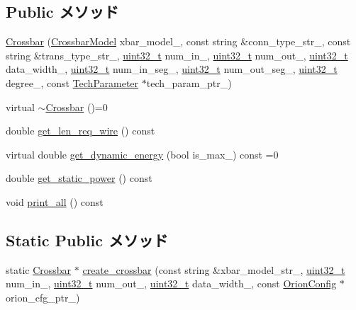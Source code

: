 \subsection*{Public メソッド}
\begin{DoxyCompactItemize}
\item 
\hyperlink{classCrossbar_a7173a2d0073951cf449b0487c70479d3}{Crossbar} (\hyperlink{classCrossbar_aa40a1579cdca31019cb80ae5fd05b613}{CrossbarModel} xbar\_\-model\_\-, const string \&conn\_\-type\_\-str\_\-, const string \&trans\_\-type\_\-str\_\-, \hyperlink{Type_8hh_a435d1572bf3f880d55459d9805097f62}{uint32\_\-t} num\_\-in\_\-, \hyperlink{Type_8hh_a435d1572bf3f880d55459d9805097f62}{uint32\_\-t} num\_\-out\_\-, \hyperlink{Type_8hh_a435d1572bf3f880d55459d9805097f62}{uint32\_\-t} data\_\-width\_\-, \hyperlink{Type_8hh_a435d1572bf3f880d55459d9805097f62}{uint32\_\-t} num\_\-in\_\-seg\_\-, \hyperlink{Type_8hh_a435d1572bf3f880d55459d9805097f62}{uint32\_\-t} num\_\-out\_\-seg\_\-, \hyperlink{Type_8hh_a435d1572bf3f880d55459d9805097f62}{uint32\_\-t} degree\_\-, const \hyperlink{classTechParameter}{TechParameter} $\ast$tech\_\-param\_\-ptr\_\-)
\item 
virtual \hyperlink{classCrossbar_a7e9410d2e04e2e7b83f7a31595dd74e9}{$\sim$Crossbar} ()=0
\item 
double \hyperlink{classCrossbar_a4081e0c25d75c90fcce79f1ccf1754ee}{get\_\-len\_\-req\_\-wire} () const 
\item 
virtual double \hyperlink{classCrossbar_ac2104354778bb800a8854b9386a66fbe}{get\_\-dynamic\_\-energy} (bool is\_\-max\_\-) const =0
\item 
double \hyperlink{classCrossbar_aeb5933543cfdeb1668baed5ce7c68351}{get\_\-static\_\-power} () const 
\item 
void \hyperlink{classCrossbar_a8404831790e4809674f0249ef6505cd5}{print\_\-all} () const 
\end{DoxyCompactItemize}
\subsection*{Static Public メソッド}
\begin{DoxyCompactItemize}
\item 
static \hyperlink{classCrossbar}{Crossbar} $\ast$ \hyperlink{classCrossbar_afc72742e1283ea982ebdc5ef6ece81d2}{create\_\-crossbar} (const string \&xbar\_\-model\_\-str\_\-, \hyperlink{Type_8hh_a435d1572bf3f880d55459d9805097f62}{uint32\_\-t} num\_\-in\_\-, \hyperlink{Type_8hh_a435d1572bf3f880d55459d9805097f62}{uint32\_\-t} num\_\-out\_\-, \hyperlink{Type_8hh_a435d1572bf3f880d55459d9805097f62}{uint32\_\-t} data\_\-width\_\-, const \hyperlink{classOrionConfig}{OrionConfig} $\ast$orion\_\-cfg\_\-ptr\_\-)
\end{DoxyCompactItemize}
